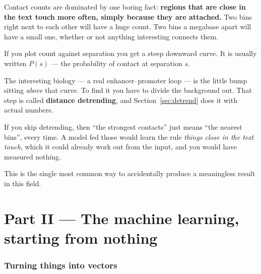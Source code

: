 \documentclass[11pt,a4paper]{article}
\newcommand{\term}[1]{\textcolor{deepblue}{\textbf{#1}}}
\begin{document}
Contact counts are dominated by one boring fact: \textbf{regions that are close
in the text touch more often, simply because they are attached.} Two bins right
next to each other will have a huge count. Two bins a megabase apart will have a
small one, whether or not anything interesting connects them.

If you plot count against separation you get a steep downward curve. It is
usually written $P(s)$ --- the probability of contact at separation $s$.

\begin{center}
\end{center}

The interesting biology --- a real enhancer--promoter loop --- is the little bump
sitting \emph{above} that curve. To find it you have to divide the background
out. That step is called \term{distance detrending}, and Section~\ref{sec:detrend}
does it with actual numbers.

\begin{carefulbox}
If you skip detrending, then ``the strongest contacts'' just means ``the nearest
bins'', every time. A model fed those would learn the rule \emph{things close in
the text touch}, which it could already work out from the input, and you would
have measured nothing.

This is the single most common way to accidentally produce a meaningless result
in this field.
\end{carefulbox}

\part*{Part II --- The machine learning, starting from nothing}

\section{Turning things into vectors}
\end{document}
